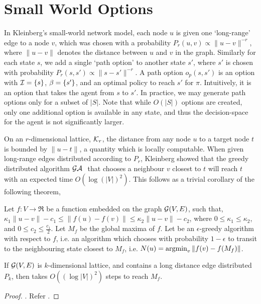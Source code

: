 \section{Small World Options}
\label{sec:theory}

In Kleinberg's small-world network model, each node $u$ is given one
`long-range' edge to a node $v$, which was chosen with a probability
$P_r(u,v) \propto \|u-v\|^{-r}$, where $\|u-v\|$ denotes the distance
between $u$ and $v$ in the graph. Similarly for each state $s$, we add
a single `path option' to another state $s'$, where $s'$ is chosen with
probability $P_r(s,s') \propto \|s-s'\|^{-r}$. A path option $o_p(s,s')$
is an option with $\mathcal{I} = \{s\}$, $\beta = \{s'\}$, and an
optimal policy to reach $s'$ for $\pi$. Intuitively, it is an option
that takes the agent from $s$ to $s'$. In practice, we may generate path
options only for a subset of $|S|$. Note that while $O(|S|)$ options are
created, only one additional option is available in any state, and thus
the decision-space for the agent is not significantly larger.

On an $r$-dimensional lattice, $\mathcal{K}_r$, the distance from any node
$u$ to a target node $t$ is bounded by $\|u-t\|$, a quantity which is
locally computable. When given long-range edges distributed according to
$P_r$, Kleinberg showed that the greedy distributed algorithm
$\mathcal{GA}~$ that chooses a neighbour $v$ closest to $t$ will reach $t$
with an expected time $O(\log(|V|)^2)$. This follows as a trivial
corollary of the following theorem,

\begin{theorem}
    \label{thm:small-world}
    Let $f : V \to \Re$ be a function embedded on the graph
    $\mathcal{G}(V,E)$, such that, $\kappa_1 \|u-v\| - c_1 \le \|f(u)
    - f(v)\| \le \kappa_2 \|u - v\| - c_2$, where $0 \le \kappa_1 \le
    \kappa_2$, and $0 \le c_2 \le \frac{c_1}{2}$. Let $M_f$ be the
    global maxima of $f$. Let \egreedyalgo be an $\epsilon$-greedy
    algorithm with respect to $f$, i.e.  an algorithm which chooses with
    probability $1-\epsilon$ to transit to the neighbouring state
    closest to $M_f$, i.e. $N(u) = \operatorname{argmin}_v \|f(v) - f(M_f)\|$.
    
    If $\mathcal{G}(V,E)$ is $k$-dimensional lattice, and contains a long
    distance edge distributed $P_k$, then \egreedyalgo takes $O( (\log
    |V|)^2 )$ steps to reach $M_f$.
\end{theorem}
\begin{proof}
  .
    Refer .
\end{proof}

